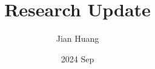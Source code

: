 \documentclass[letterpaper,12pt]{article}
\title{\bfseries Research Update}
\author{Jian Huang}
\date{2024 Sep}
\numberwithin{figure}{section}
\numberwithin{table}{section}
\begin{document}
\maketitle
\begin{sloppypar}   %




\newpage

% 


\end{sloppypar}
\end{document}
